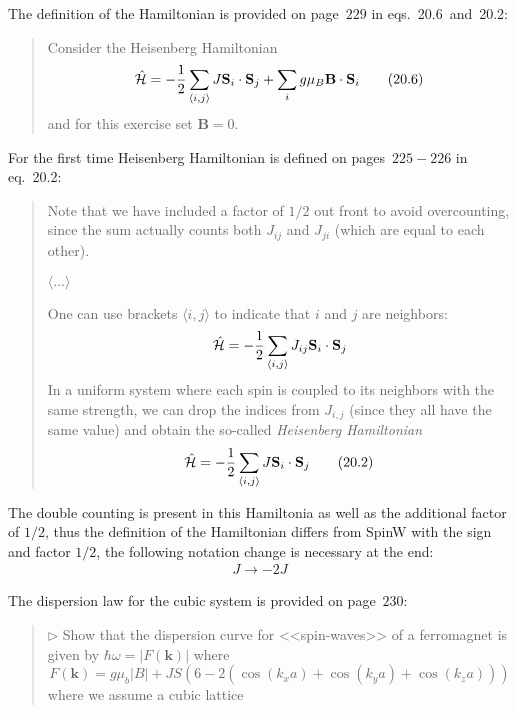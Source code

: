     The definition of the Hamiltonian is provided on page~$229$ in eqs.~20.6~and~20.2:

    \begin{quote}
        Consider the Heisenberg Hamiltonian
        \begin{equation}
            \hat{\mathcal{H}} = -\dfrac{1}{2}\sum_{\langle i,j \rangle} J \mathbf{S}_i \cdot \mathbf{S}_j + \sum_i g\mu_B \mathbf{B} \cdot \mathbf{S}_i \label{eq:ossb-20.6} \tag{20.6}
        \end{equation}
        and  for this exercise set $\mathbf{B} = 0$.
    \end{quote}

    For the first time Heisenberg Hamiltonian is defined on pages~$225-226$ in eq.~20.2:
    \begin{quote}
        Note that we have included a factor of $1/2$ out front to avoid overcounting, since the sum actually counts both $J_{ij}$ and $J_{ji}$ (which are equal to each other).

        $\langle ... \rangle$

        One can use brackets $\langle i,j\rangle$ to indicate that $i$ and $j$ are neighbors:
        \begin{equation}
            \hat{\mathcal{H}} = -\dfrac{1}{2}\sum_{\langle i,j \rangle} J_{ij} \mathbf{S}_i \cdot \mathbf{S}_j
        \end{equation}
        In a uniform system where each spin is coupled to its neighbors with the same strength, we can drop the indices from $J_{i,j}$ (since they all have the same value) and obtain the so-called \textit{Heisenberg Hamiltonian}
        \begin{equation}
            \hat{\mathcal{H}} = -\dfrac{1}{2}\sum_{\langle i,j \rangle} J \mathbf{S}_i \cdot \mathbf{S}_j \label{eq:ossb-20.2} \tag{20.2}
        \end{equation}
    \end{quote}

    The double counting is present in this Hamiltonia as well as the additional factor of $1/2$, thus the definition of the Hamiltonian differs from SpinW with the sign and factor $1/2$, the following notation change is necessary at the end:
    \begin{equation}
        \begin{matrix} 
            J \rightarrow -2J
        \end{matrix}
    \end{equation}

    The dispersion law for the cubic system is provided  on page~$230$:
    \begin{quote}
        $\triangleright$ Show that the dispersion curve for <<spin-waves>> of a ferromagnet is given by $\hbar\omega = \vert F(\mathbf{k})\vert$  where
        \begin{equation}
            F(\mathbf{k}) = g\mu_b\vert B \vert + JS\left(6 - 2\left(\cos(k_xa) + \cos(k_ya) + \cos(k_za)\right)\right)
        \end{equation}
        where we assume a cubic lattice
    \end{quote}

